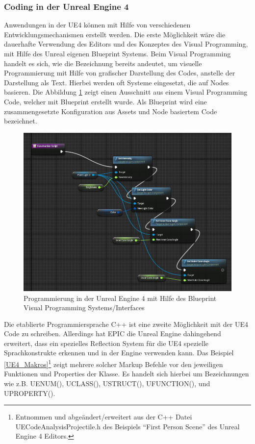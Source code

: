 \documentclass[pagesize, paper=a4, fontsize=12pt, titlepage=true, headings=small, headnosepline, abstractoff, liststotoc, nochapterprefix, plainheadsepline, twoside]{scrreprt}
\begin{document}
\subsubsection{Coding in der Unreal Engine 4}
Anwendungen in der UE4 können mit Hilfe von verschiedenen Entwicklungsmechanismen erstellt werden. Die erste Möglichkeit wäre die dauerhafte Verwendung des Editors und des Konzeptes des Visual Programming, mit Hilfe des Unreal eigenen Blueprint Systems. Beim Visual Programming handelt es sich, wie die Bezeichnung bereits andeutet, um visuelle Programmierung mit Hilfe von grafischer Darstellung des Codes, anstelle der Darstellung als Text. Hierbei werden oft Systeme eingesetzt, die auf Nodes basieren. Die Abbildung \ref{UE4Blueprint} zeigt einen Ausschnitt aus einem Visual Programming Code, welcher mit Blueprint erstellt wurde. Als Blueprint wird eine zusammengesetzte Konfiguration aus Assets und Node basiertem Code bezeichnet.

\begin{figure}[ht]
	\centering
	\includegraphics[width=\linewidth]{Bilder/ue4Blueprint.jpg}
	\caption{Programmierung in der Unreal Engine 4 mit Hilfe des Blueprint Visual Programming Systems/Interfaces}
	\label{UE4Blueprint}	
\end{figure} 

Die etablierte Programmiersprache C++ ist eine zweite Möglichkeit mit der UE4 Code zu schreiben. Allerdings hat EPIC die Unreal Engine  dahingehend erweitert, dass ein spezielles Reflection System für die UE4 spezielle Sprachkonstrukte erkennen und in der Engine verwenden kann. Das Beispiel \ref{UE4_Makros}\footnote{Entnommen und abgeändert/erweitert aus der C++ Datei UECodeAnalysisProjectile.h des Beispiels “First Person Scene” des Unreal Engine 4 Editors.} zeigt mehrere solcher Markup Befehle vor den jeweiligen Funktionen und Properties der Klasse. Es handelt sich hierbei um Bezeichnungen wie z.B. UENUM(), UCLASS(), USTRUCT(), UFUNCTION(), und UPROPERTY().
\end{document}

